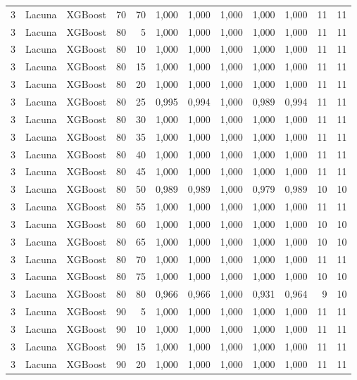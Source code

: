 \begin{longtable}{ccclrrrrrrrr}
3 & Lacuna & XGBoost & 70 & 70 & 1,000 & 1,000 & 1,000 & 1,000 & 1,000 & 11 & 11 \\
3 & Lacuna & XGBoost & 80 & 5 & 1,000 & 1,000 & 1,000 & 1,000 & 1,000 & 11 & 11 \\
3 & Lacuna & XGBoost & 80 & 10 & 1,000 & 1,000 & 1,000 & 1,000 & 1,000 & 11 & 11 \\
3 & Lacuna & XGBoost & 80 & 15 & 1,000 & 1,000 & 1,000 & 1,000 & 1,000 & 11 & 11 \\
3 & Lacuna & XGBoost & 80 & 20 & 1,000 & 1,000 & 1,000 & 1,000 & 1,000 & 11 & 11 \\
3 & Lacuna & XGBoost & 80 & 25 & 0,995 & 0,994 & 1,000 & 0,989 & 0,994 & 11 & 11 \\
3 & Lacuna & XGBoost & 80 & 30 & 1,000 & 1,000 & 1,000 & 1,000 & 1,000 & 11 & 11 \\
3 & Lacuna & XGBoost & 80 & 35 & 1,000 & 1,000 & 1,000 & 1,000 & 1,000 & 11 & 11 \\
3 & Lacuna & XGBoost & 80 & 40 & 1,000 & 1,000 & 1,000 & 1,000 & 1,000 & 11 & 11 \\
3 & Lacuna & XGBoost & 80 & 45 & 1,000 & 1,000 & 1,000 & 1,000 & 1,000 & 11 & 11 \\
3 & Lacuna & XGBoost & 80 & 50 & 0,989 & 0,989 & 1,000 & 0,979 & 0,989 & 10 & 10 \\
3 & Lacuna & XGBoost & 80 & 55 & 1,000 & 1,000 & 1,000 & 1,000 & 1,000 & 11 & 11 \\
3 & Lacuna & XGBoost & 80 & 60 & 1,000 & 1,000 & 1,000 & 1,000 & 1,000 & 10 & 10 \\
3 & Lacuna & XGBoost & 80 & 65 & 1,000 & 1,000 & 1,000 & 1,000 & 1,000 & 10 & 10 \\
3 & Lacuna & XGBoost & 80 & 70 & 1,000 & 1,000 & 1,000 & 1,000 & 1,000 & 11 & 11 \\
3 & Lacuna & XGBoost & 80 & 75 & 1,000 & 1,000 & 1,000 & 1,000 & 1,000 & 10 & 10 \\
3 & Lacuna & XGBoost & 80 & 80 & 0,966 & 0,966 & 1,000 & 0,931 & 0,964 & 9 & 10 \\
3 & Lacuna & XGBoost & 90 & 5 & 1,000 & 1,000 & 1,000 & 1,000 & 1,000 & 11 & 11 \\
3 & Lacuna & XGBoost & 90 & 10 & 1,000 & 1,000 & 1,000 & 1,000 & 1,000 & 11 & 11 \\
3 & Lacuna & XGBoost & 90 & 15 & 1,000 & 1,000 & 1,000 & 1,000 & 1,000 & 11 & 11 \\
3 & Lacuna & XGBoost & 90 & 20 & 1,000 & 1,000 & 1,000 & 1,000 & 1,000 & 11 & 11 \\

\end{longtable}
